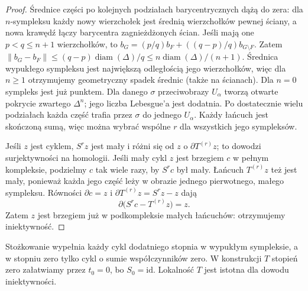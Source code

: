 \documentclass[11pt,a4paper,oneside]{report}
\newcommand{\id}{\mathrm{id}}
\theoremstyle{plain}
\theoremstyle{definition}
\theoremstyle{remark}
\begin{document}
\begin{proof}
Średnice części po kolejnych podziałach
barycentrycznych dążą do zera: dla
$n$-sympleksu każdy nowy wierzchołek
jest średnią wierzchołków pewnej ściany,
a nowa krawędź łączy barycentra zagnieżdżonych ścian.
Jeśli mają one $p<q\leq n+1$ wierzchołków, to
$b_G=(p/q)b_F+((q-p)/q)b_{G\setminus F}$.
Zatem $\|b_G-b_F\|\leq(q-p)\operatorname{diam}(\Delta)/q
\leq n\operatorname{diam}(\Delta)/(n+1)$.
Średnica wypukłego sympleksu jest największą odległością jego
wierzchołków, więc dla $n\geq1$ otrzymujemy geometryczny spadek
średnic (także na ścianach). Dla $n=0$ sympleks jest już punktem. Dla danego $\sigma$
przeciwobrazy $U_\alpha$ tworzą
otwarte pokrycie zwartego $\Delta^n$;
jego liczba Lebesgue'a jest dodatnia.
Po dostatecznie wielu podziałach
każda część trafia przez $\sigma$
do jednego $U_\alpha$.
Każdy łańcuch jest skończoną sumą,
więc można wybrać wspólne $r$
dla wszystkich jego sympleksów.

Jeśli $z$ jest cyklem, $S^rz$
jest mały i różni się od $z$
o $\partial T^{(r)}z$; to dowodzi
surjektywności na homologii.
Jeśli mały cykl $z$ jest brzegiem
$c$ w pełnym kompleksie, podzielmy
$c$ tak wiele razy, by $S^rc$
był mały. Łańcuch $T^{(r)}z$
też jest mały, ponieważ każda
jego część leży w obrazie
jednego pierwotnego, małego sympleksu.
Równości $\partial c=z$ i
$\partial T^{(r)}z=S^rz-z$ dają
\[
 \partial\bigl(S^rc-T^{(r)}z\bigr)=z.
\]
Zatem $z$ jest brzegiem już
w podkompleksie małych łańcuchów:
otrzymujemy iniektywność.
\end{proof}

Stożkowanie wypełnia każdy cykl dodatniego stopnia w wypukłym
sympleksie, a w stopniu zero tylko cykl o sumie współczynników zero.
W konstrukcji $T$ stopień zero załatwiamy przez $t_0=0$,
bo $S_0=\id$. Lokalność $T$ jest istotna dla dowodu iniektywności.
\end{document}
